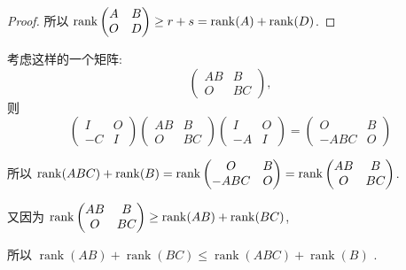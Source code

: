 \begin{problem}
\begin{solution}
\begin{proof}[Proof]
            所以 $\operatorname{rank}\begin{pmatrix}
                A & B \\ O & D
                \end{pmatrix} \ge r+s = \operatorname{rank}(A) + \operatorname{rank}(D)$. 
        \end{proof}

        考虑这样的一个矩阵:
        \[
            \begin{pmatrix}
                AB & B \\ O & BC
            \end{pmatrix},
        \]
        则
        \[
            \begin{pmatrix}
                I & O \\ -C & I
            \end{pmatrix}
            \begin{pmatrix}
                AB & B \\ O & BC
            \end{pmatrix}
            \begin{pmatrix}
                I & O \\ -A & I
            \end{pmatrix} = 
            \begin{pmatrix}
                O & B \\ -ABC & O
            \end{pmatrix}
        \]

        所以 $\operatorname{rank}(ABC) + \operatorname{rank}(B) = \operatorname{rank} \begin{pmatrix} O & B \\ -ABC & O \end{pmatrix} = \operatorname{rank}\begin{pmatrix} AB & B \\ O & BC \end{pmatrix}$.

        又因为 $\operatorname{rank}\begin{pmatrix} AB & B \\ O & BC \end{pmatrix} \ge \operatorname{rank}(AB) + \operatorname{rank}(BC)$,
        
        所以 $\operatorname{rank}(AB)+\operatorname{rank}(BC)\le \operatorname{rank}(ABC)+\operatorname{rank}(B)$ .
    \end{solution}
\end{problem}

